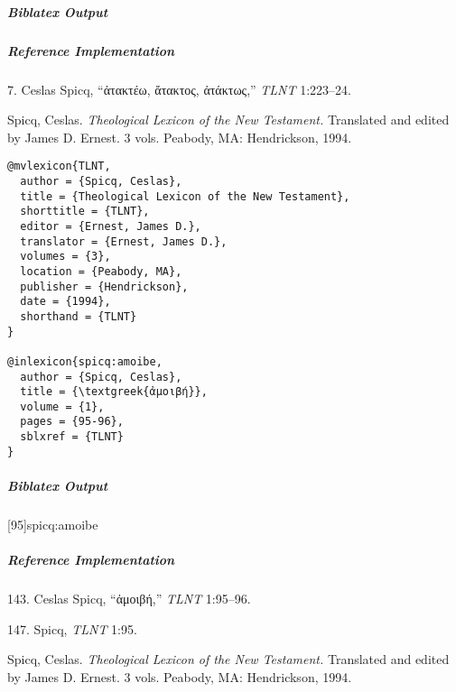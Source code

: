 \documentclass[a4paper]{article}
\newcommand{\textgreek}[1]{{\greekfont #1}}
\newenvironment{biboutput}{%
  \subparagraph{Biblatex Output}
}{\color{black}}
\newenvironment{refimp}{%
  \subparagraph{Reference Implementation}
  \color{reference-colour}
  \rm
}{\par\color{black}}
\begin{document}
\begin{biboutput}
\end{biboutput}

\begin{refimp}
  \hspace*{\bibindent}7. Ceslas Spicq, “\textgreek{ἀτακτέω, ἄτακτος, ἀτάκτως},”
  \emph{TLNT} 1:223–24.

  \hangindent\bibindent Spicq, Ceslas. \emph{Theological Lexicon of the New
  Testament.} Translated and edited by James D. Ernest. 3 vols. Peabody, MA:
  Hendrickson, 1994.

\end{refimp}

\medskip

\begin{lstlisting}
@mvlexicon{TLNT,
  author = {Spicq, Ceslas},
  title = {Theological Lexicon of the New Testament},
  shorttitle = {TLNT},
  editor = {Ernest, James D.},
  translator = {Ernest, James D.},
  volumes = {3},
  location = {Peabody, MA},
  publisher = {Hendrickson},
  date = {1994},
  shorthand = {TLNT}
}

@inlexicon{spicq:amoibe,
  author = {Spicq, Ceslas},
  title = {\textgreek{ἀμοιβή}},
  volume = {1},
  pages = {95-96},
  sblxref = {TLNT}
}
\end{lstlisting}

\begin{biboutput}
  [95]{spicq:amoibe}
\end{biboutput}

\begin{refimp}
  143. Ceslas Spicq, “\textgreek{ἀμοιβή},” \emph{TLNT} 1:95–96.

  147. Spicq, \emph{TLNT} 1:95.

  \hangindent\bibindent Spicq, Ceslas. \emph{Theological Lexicon of the New
  Testament.} Translated and edited by James D. Ernest. 3 vols. Peabody, MA:
  Hendrickson, 1994.

\end{refimp}
\end{document}
